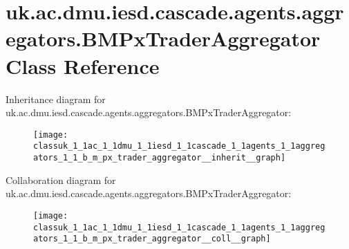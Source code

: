 \hypertarget{classuk_1_1ac_1_1dmu_1_1iesd_1_1cascade_1_1agents_1_1aggregators_1_1_b_m_px_trader_aggregator}{\section{uk.\-ac.\-dmu.\-iesd.\-cascade.\-agents.\-aggregators.\-B\-M\-Px\-Trader\-Aggregator Class Reference}
\label{classuk_1_1ac_1_1dmu_1_1iesd_1_1cascade_1_1agents_1_1aggregators_1_1_b_m_px_trader_aggregator}
}


Inheritance diagram for uk.\-ac.\-dmu.\-iesd.\-cascade.\-agents.\-aggregators.\-B\-M\-Px\-Trader\-Aggregator\-:\nopagebreak
\begin{figure}[H]
\begin{center}
\leavevmode
\texttt{[image: classuk\_1\_1ac\_1\_1dmu\_1\_1iesd\_1\_1cascade\_1\_1agents\_1\_1aggregators\_1\_1\_b\_m\_px\_trader\_aggregator\_\_inherit\_\_graph]}
\end{center}
\end{figure}


Collaboration diagram for uk.\-ac.\-dmu.\-iesd.\-cascade.\-agents.\-aggregators.\-B\-M\-Px\-Trader\-Aggregator\-:\nopagebreak
\begin{figure}[H]
\begin{center}
\leavevmode
\texttt{[image: classuk\_1\_1ac\_1\_1dmu\_1\_1iesd\_1\_1cascade\_1\_1agents\_1\_1aggregators\_1\_1\_b\_m\_px\_trader\_aggregator\_\_coll\_\_graph]}
\end{center}
\end{figure}
